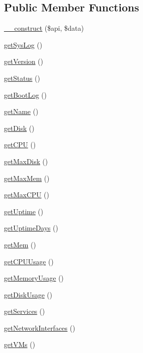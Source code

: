 \subsection*{Public Member Functions}
\begin{DoxyCompactItemize}
\item 
\hyperlink{class_proxmox_node_ad0acce3d3a3ee348187ecadeab3475c4}{\+\_\+\+\_\+construct} (\$api, \$data)
\item 
\hyperlink{class_proxmox_node_a16fc5493c00621df5ef6c7ca4e2a7860}{get\+Sys\+Log} ()
\item 
\hyperlink{class_proxmox_node_afa8e7a3a646144eab50188b7a805a389}{get\+Version} ()
\item 
\hyperlink{class_proxmox_node_a9d21636071f529e2154051d3ea6e5921}{get\+Status} ()
\item 
\hyperlink{class_proxmox_node_a1983ef1b22d4c48d610472ff8e6bd18c}{get\+Boot\+Log} ()
\item 
\hyperlink{class_proxmox_node_a3d0963e68bb313b163a73f2803c64600}{get\+Name} ()
\item 
\hyperlink{class_proxmox_node_a16938d200befaaa1c1c97cdd2221b774}{get\+Disk} ()
\item 
\hyperlink{class_proxmox_node_a11390c027c03d78c3bda4e40ec384155}{get\+C\+P\+U} ()
\item 
\hyperlink{class_proxmox_node_a8af01aab0c52dd578e357f9ba6496c13}{get\+Max\+Disk} ()
\item 
\hyperlink{class_proxmox_node_a94a5b72f76ca4130d47e1c94ffa4e958}{get\+Max\+Mem} ()
\item 
\hyperlink{class_proxmox_node_ab4e4670092a2e4fe2e4a1d9c8aab9b8d}{get\+Max\+C\+P\+U} ()
\item 
\hyperlink{class_proxmox_node_a729fd496363f1c2268ad9545d018dc9a}{get\+Uptime} ()
\item 
\hyperlink{class_proxmox_node_a064417ab9ef3ec9aa9dd0b5bcc1c2037}{get\+Uptime\+Days} ()
\item 
\hyperlink{class_proxmox_node_a9bbc5ce58f73c826c8c568cf1ece0deb}{get\+Mem} ()
\item 
\hyperlink{class_proxmox_node_a2f951beefbf86eef6ae29615ced2d61f}{get\+C\+P\+U\+Usage} ()
\item 
\hyperlink{class_proxmox_node_a82fc8c3d55384c54b49784d244b0ed94}{get\+Memory\+Usage} ()
\item 
\hyperlink{class_proxmox_node_a08ed211a8a23f1a03ec811af6c382230}{get\+Disk\+Usage} ()
\item 
\hyperlink{class_proxmox_node_a36d7e45e7f713b49a02b4988be6cbcd1}{get\+Services} ()
\item 
\hyperlink{class_proxmox_node_ad4eaf4b9b1ac33466f6aa40f1f1b920a}{get\+Network\+Interfaces} ()
\item 
\hyperlink{class_proxmox_node_a7972a94fd5b803d9d4c18d13e84a4903}{get\+V\+Ms} ()
\end{DoxyCompactItemize}
